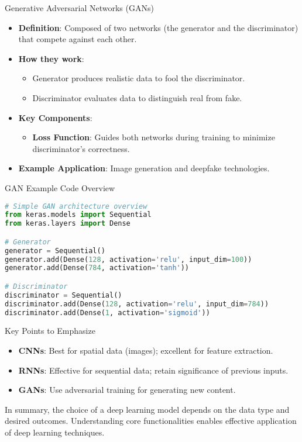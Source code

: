 \documentclass[aspectratio=169]{beamer}
\begin{document}
\begin{frame}{Generative Adversarial Networks (GANs)}
    \begin{itemize}
        \item \textbf{Definition}: Composed of two networks (the generator and the discriminator) that compete against each other.
        \item \textbf{How they work}:
        \begin{itemize}
            \item Generator produces realistic data to fool the discriminator.
            \item Discriminator evaluates data to distinguish real from fake.
        \end{itemize}
        \item \textbf{Key Components}:
        \begin{itemize}
            \item \textbf{Loss Function}: Guides both networks during training to minimize discriminator's correctness.
        \end{itemize}
        \item \textbf{Example Application}: Image generation and deepfake technologies.
    \end{itemize}
\end{frame}

\begin{frame}[fragile]{GAN Example Code Overview}
    \begin{lstlisting}[language=Python]
# Simple GAN architecture overview
from keras.models import Sequential
from keras.layers import Dense

# Generator
generator = Sequential()
generator.add(Dense(128, activation='relu', input_dim=100))
generator.add(Dense(784, activation='tanh'))

# Discriminator
discriminator = Sequential()
discriminator.add(Dense(128, activation='relu', input_dim=784))
discriminator.add(Dense(1, activation='sigmoid'))
    \end{lstlisting}
\end{frame}

\begin{frame}{Key Points to Emphasize}
    \begin{itemize}
        \item \textbf{CNNs}: Best for spatial data (images); excellent for feature extraction.
        \item \textbf{RNNs}: Effective for sequential data; retain significance of previous inputs.
        \item \textbf{GANs}: Use adversarial training for generating new content.
    \end{itemize}
    In summary, the choice of a deep learning model depends on the data type and desired outcomes. Understanding core functionalities enables effective application of deep learning techniques.
\end{frame}
\end{document}
